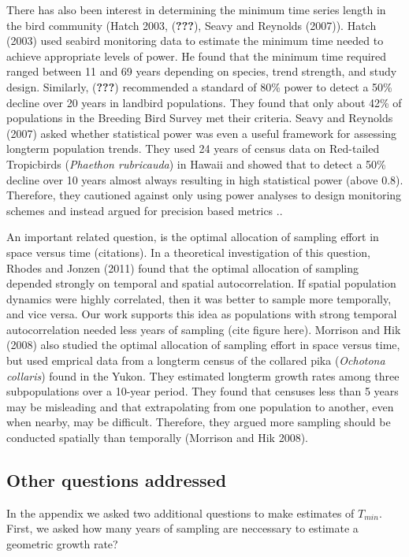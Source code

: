 \documentclass[12pt,]{article}
\begin{document}
There has also been interest in determining the minimum time series
length in the bird community (Hatch 2003, ({\textbf{???}}), Seavy and
Reynolds (2007)). Hatch (2003) used seabird monitoring data to estimate
the minimum time needed to achieve appropriate levels of power. He found
that the minimum time required ranged between 11 and 69 years depending
on species, trend strength, and study design. Similarly,
({\textbf{???}}) recommended a standard of 80\% power to detect a 50\%
decline over 20 years in landbird populations. They found that only
about 42\% of populations in the Breeding Bird Survey met their
criteria. Seavy and Reynolds (2007) asked whether statistical power was
even a useful framework for assessing longterm population trends. They
used 24 years of census data on Red-tailed Tropicbirds
(\emph{Phaethon rubricauda}) in Hawaii and showed that to detect a 50\%
decline over 10 years almost always resulting in high statistical power
(above 0.8). Therefore, they cautioned against only using power analyses
to design monitoring schemes and instead argued for precision based
metrics ..

An important related question, is the optimal allocation of sampling
effort in space versus time (citations). In a theoretical investigation
of this question, Rhodes and Jonzen (2011) found that the optimal
allocation of sampling depended strongly on temporal and spatial
autocorrelation. If spatial population dynamics were highly correlated,
then it was better to sample more temporally, and vice versa. Our work
supports this idea as populations with strong temporal autocorrelation
needed less years of sampling (cite figure here). Morrison and Hik
(2008) also studied the optimal allocation of sampling effort in space
versus time, but used emprical data from a longterm census of the
collared pika (\emph{Ochotona collaris}) found in the Yukon. They
estimated longterm growth rates among three subpopulations over a
10-year period. They found that censuses less than 5 years may be
misleading and that extrapolating from one population to another, even
when nearby, may be difficult. Therefore, they argued more sampling
should be conducted spatially than temporally (Morrison and Hik 2008).

\subsection{Other questions addressed}\label{other-questions-addressed}

In the appendix we asked two additional questions to make estimates of
\(T_{min}\). First, we asked how many years of sampling are neccessary
to estimate a geometric growth rate?
\end{document}
